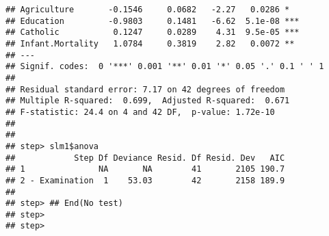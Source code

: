 \documentclass{beamer}\usepackage[]{graphicx}\usepackage[]{xcolor}
\newenvironment{knitrout}{}{} %
\begin{document}
\begin{frame}
\begin{knitrout}
\begin{verbatim}
## Agriculture       -0.1546     0.0682   -2.27   0.0286 *  
## Education         -0.9803     0.1481   -6.62  5.1e-08 ***
## Catholic           0.1247     0.0289    4.31  9.5e-05 ***
## Infant.Mortality   1.0784     0.3819    2.82   0.0072 ** 
## ---
## Signif. codes:  0 '***' 0.001 '**' 0.01 '*' 0.05 '.' 0.1 ' ' 1
## 
## Residual standard error: 7.17 on 42 degrees of freedom
## Multiple R-squared:  0.699,	Adjusted R-squared:  0.671 
## F-statistic: 24.4 on 4 and 42 DF,  p-value: 1.72e-10
## 
## 
## step> slm1$anova
##            Step Df Deviance Resid. Df Resid. Dev   AIC
## 1               NA       NA        41       2105 190.7
## 2 - Examination  1    53.03        42       2158 189.9
## 
## step> ## End(No test)
## step> 
## step>
\end{verbatim}

\end{knitrout}
\end{frame}
\end{document}
